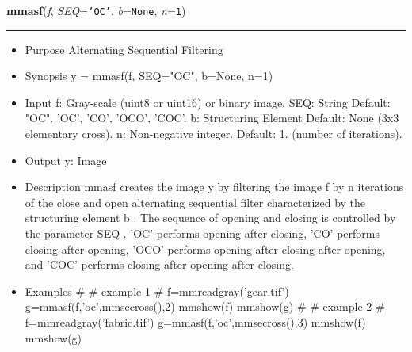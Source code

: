     \begin{boxedminipage}{\textwidth}

    \raggedright \textbf{mmasf}(\textit{f}, \textit{SEQ}=\texttt{'\-O\-C\-'\-}, \textit{b}=\texttt{N\-o\-n\-e\-}, \textit{n}=\texttt{1\-})

    \vspace{-1.5ex}

    \rule{\textwidth}{0.5\fboxrule}
    \begin{itemize}
    \setlength{\parskip}{0.6ex}
      \item Purpose Alternating Sequential Filtering

      \item Synopsis y = mmasf(f, SEQ="OC", b=None, n=1)

      \item Input f: Gray-scale (uint8 or uint16) or binary image. SEQ: 
        String Default: "OC". 'OC', 'CO', 'OCO', 'COC'. b: Structuring 
        Element Default: None (3x3 elementary cross). n: Non-negative 
        integer. Default: 1. (number of iterations).

      \item Output y: Image

      \item Description mmasf creates the image y by filtering the image f by 
        n iterations of the close and open alternating sequential filter 
        characterized by the structuring element b . The sequence of 
        opening and closing is controlled by the parameter SEQ . 'OC' 
        performs opening after closing, 'CO' performs closing after 
        opening, 'OCO' performs opening after closing after opening, and 
        'COC' performs closing after opening after closing.

      \item Examples \# \# example 1 \# f=mmreadgray('gear.tif') 
        g=mmasf(f,'oc',mmsecross(),2) mmshow(f) mmshow(g) \# \# example 2 
        \# f=mmreadgray('fabric.tif') g=mmasf(f,'oc',mmsecross(),3) 
        mmshow(f) mmshow(g)

    \end{itemize}

    \vspace{1ex}

    \end{boxedminipage}

    \label{multireg:num_pymorph:mmasfrec}
    \vspace{0.5ex}

